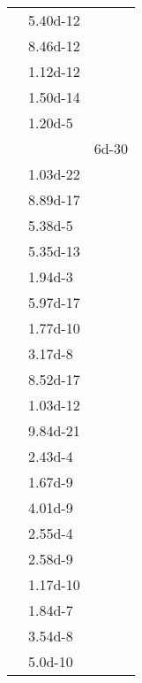 \documentclass[a4paper, 10pt]{article}
\begin{document}
\begin{footnotesize}
    \begin{supertabular}{lll}
         &  \num{5.40d-12} &              \\
         &  \num{8.46d-12} &              \\
        &  \num{1.12d-12} &              \\
         &  \num{1.50d-14} &              \\
         &   \num{1.20d-5} &              \\
           &                 &  \num{6d-30} \\
        &  \num{1.03d-22} &              \\
         &  \num{8.89d-17} &              \\
         &   \num{5.38d-5} &              \\
           &  \num{5.35d-13} &              \\
       &   \num{1.94d-3} &              \\
           &  \num{5.97d-17} &              \\
           &  \num{1.77d-10} &              \\
          &   \num{3.17d-8} &              \\
            &  \num{8.52d-17} &              \\
          &  \num{1.03d-12} &              \\
          &  \num{9.84d-21} &              \\
      &   \num{2.43d-4} &              \\
   &   \num{1.67d-9} &              \\
       &   \num{4.01d-9} &              \\
   &   \num{2.55d-4} &              \\
          &   \num{2.58d-9} &              \\
         &  \num{1.17d-10} &              \\
           &   \num{1.84d-7} &              \\
         &   \num{3.54d-8} &              \\
          &   \num{5.0d-10} &              \\

\end{supertabular}
\end{footnotesize}
\end{document}
